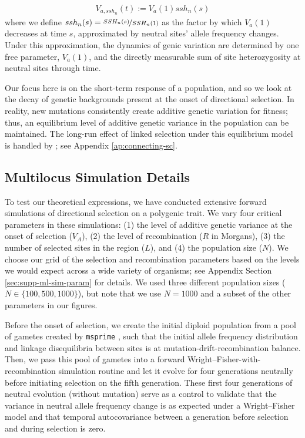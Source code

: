 \documentclass[11pt]{article}
\begin{document}
\begin{align}
  V_{a,ssh_n}(t) := V_a(1) ssh_n(s)
\end{align}
%
where we define $ssh_n(s) = \nicefrac{SSH_n(s)}{SSH_n(1)}$ as the factor by
which $V_a(1)$ decreases at time $s$, approximated by neutral sites' allele
frequency changes. Under this approximation, the dynamics of genic variation
are determined by one free parameter, $V_a(1)$, and the directly measurable sum of
site heterozygosity at neutral sites through time. 

Our focus here is on the short-term response of a population, and so we look at
the decay of genetic backgrounds present at the onset of directional selection.
In reality, new mutations consistently create additive genetic variation for
fitness; thus, an equilibrium level of additive genetic variance in the
population can be maintained. The long-run effect of linked selection under
this equilibrium model is handled by
\textcite{Santiago1995-hx,Santiago1998-bs}; see Appendix
\ref{ap:connecting-sc}.

\subsection{Multilocus Simulation Details}
\label{sec:ml-sim}

To test our theoretical expressions, we have conducted extensive forward
simulations of directional selection on a polygenic trait. We vary four
critical parameters in these simulations: (1) the level of additive genetic
variance at the onset of selection ($V_A$), (2) the level of recombination ($R$
in Morgans), (3) the number of selected sites in the region ($L$), and (4) the
population size ($N$). We choose our grid of the selection and recombination
parameters based on the levels we would expect across a wide variety of
organisms; see Appendix Section \ref{sec:supp-ml-sim-param} for details. We
used three different population sizes ($N \in \{100, 500, 1000\}$), but note
that we use $N=1000$ and a subset of the other parameters in our figures.


Before the onset of selection, we create the initial diploid population from a
pool of gametes created by \texttt{msprime} \parencite{Kelleher2016-oi}, such
that the initial allele frequency distribution and linkage disequilibria
between sites is at mutation-drift-recombination balance. Then, we pass this
pool of gametes into a forward Wright--Fisher-with-recombination simulation
routine and let it evolve for four generations neutrally before initiating
selection on the fifth generation.  These first four generations of neutral
evolution (without mutation) serve as a control to validate that the variance
in neutral allele frequency change is as expected under a Wright--Fisher model
and that temporal autocovariance between a generation before selection and
during selection is zero.
\end{document}
